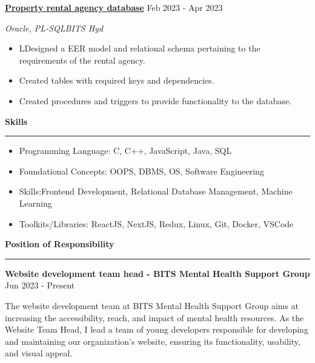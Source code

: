 \documentclass[a4paper,12pt]{report}
\begin{document}
\noindent 
\textbf{\href{https://github.com/sumansekharsahoo/DBMS-Project}{\color{black}Property rental agency database}} \hfill  {\fontsize{12pt}{12pt}\selectfont Feb 2023 - Apr 2023} \par
\noindent
{\fontsize{12pt}{12pt}\selectfont \textit{Oracle, PL-SQL}\hfill\textit{BITS Hyd}} \par
\noindent 
\begin{itemize}[noitemsep,topsep=0pt]
    \item {\fontsize{12pt}{12pt}\selectfont LDesigned a EER model and relational schema pertaining to the requirements of the rental agency. } \par
    \item {\fontsize{12pt}{12pt}\selectfont Created tables with required keys and dependencies. } \par
    \item {\fontsize{12pt}{12pt}\selectfont Created procedures and triggers to provide functionality to the database.} \par
\end{itemize}

 \par
\vspace{9pt}


\noindent 
\textbf{Skills} \par
\vspace{2pt}
\hrule
\vspace{6pt}
\noindent 
\begin{itemize}[noitemsep,topsep=0pt]
\item {\fontsize{12pt}{12pt}\selectfont Programming Language:}  C, C++, JavaScript, Java, SQL \par
\noindent 
\item {\fontsize{12pt}{12pt}\selectfont Foundational Concepts:} OOPS, DBMS, OS, Software Engineering \par
\noindent 
\item {\fontsize{12pt}{12pt}\selectfont Skills:}Frontend Development, Relational Database Management, Machine Learning \par
\noindent 
\item {\fontsize{12pt}{12pt}\selectfont Toolkits/Libraries:} ReactJS, NextJS, Redux, Linux, Git, Docker, VSCode \par
\end{itemize}

\noindent
\textbf{Position of Responsibility} \par
\vspace{2pt}
\hrule
\vspace{6pt}
\noindent 
\textbf{{\color{black}Website development team head - BITS Mental Health Support Group}} \hfill  {\fontsize{12pt}{12pt}\selectfont Jun 2023 - Present} \par
\noindent
The website development team at BITS Mental Health Support Group aims at increasing the accessibility, reach, and impact of mental health resources. As the Website Team Head, I lead a team of young developers responsible for developing and maintaining our organization's website, ensuring its functionality, usability, and visual appeal. 
\end{document}

